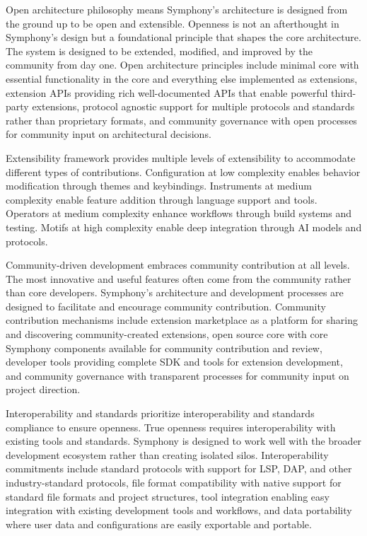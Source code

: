Open architecture philosophy means Symphony's architecture is designed from the ground up to be open and extensible. Openness is not an afterthought in Symphony's design but a foundational principle that shapes the core architecture. The system is designed to be extended, modified, and improved by the community from day one. Open architecture principles include minimal core with essential functionality in the core and everything else implemented as extensions, extension APIs providing rich well-documented APIs that enable powerful third-party extensions, protocol agnostic support for multiple protocols and standards rather than proprietary formats, and community governance with open processes for community input on architectural decisions.

Extensibility framework provides multiple levels of extensibility to accommodate different types of contributions. Configuration at low complexity enables behavior modification through themes and keybindings. Instruments at medium complexity enable feature addition through language support and tools. Operators at medium complexity enhance workflows through build systems and testing. Motifs at high complexity enable deep integration through AI models and protocols.

Community-driven development embraces community contribution at all levels. The most innovative and useful features often come from the community rather than core developers. Symphony's architecture and development processes are designed to facilitate and encourage community contribution. Community contribution mechanisms include extension marketplace as a platform for sharing and discovering community-created extensions, open source core with core Symphony components available for community contribution and review, developer tools providing complete SDK and tools for extension development, and community governance with transparent processes for community input on project direction.

Interoperability and standards prioritize interoperability and standards compliance to ensure openness. True openness requires interoperability with existing tools and standards. Symphony is designed to work well with the broader development ecosystem rather than creating isolated silos. Interoperability commitments include standard protocols with support for LSP, DAP, and other industry-standard protocols, file format compatibility with native support for standard file formats and project structures, tool integration enabling easy integration with existing development tools and workflows, and data portability where user data and configurations are easily exportable and portable.

